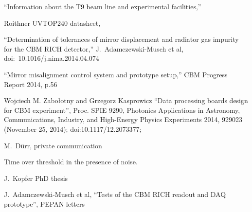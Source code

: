\begin{thebibliography}{99}
``Information about the T9 beam line and experimental facilities,''

Roithner UVTOP240 datasheet,

``Determination of tolerances of mirror displacement and radiator gas impurity for the CBM RICH detector,''
J.~Adamczewski-Musch et al,
doi:~10.1016/j.nima.2014.04.074

``Mirror misalignment control system and prototype setup,''
CBM Progress Report 2014, p.56

Wojciech M. Zabołotny and Grzegorz Kasprowicz
``Data processing boards design for CBM experiment'',
Proc. SPIE 9290, Photonics Applications in Astronomy, Communications, Industry, and High-Energy Physics Experiments 2014, 929023 (November 25, 2014); doi:10.1117/12.2073377;

M.~D\"urr, private communication

Time over threshold in the presence of noise.

J.~Kopfer PhD thesis

J.~Adamczewski-Musch et al,
``Tests of the CBM RICH readout and DAQ prototype'',
PEPAN letters

\end{thebibliography}
